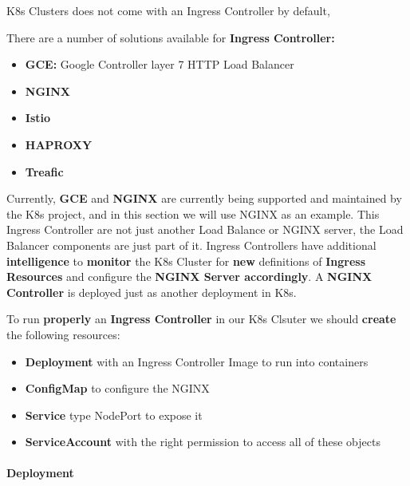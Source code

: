 \documentclass{article}
\begin{document}
K8s Clusters does not come with an Ingress Controller by default, 

There are a number of solutions available for \textbf{Ingress Controller:}
\begin{itemize}
    \item \textbf{GCE:} Google Controller layer 7 HTTP Load Balancer
    \item \textbf{NGINX}
    \item \textbf{Istio}
    \item \textbf{HAPROXY}
    \item \textbf{Treafic}
\end{itemize}

Currently, \textbf{GCE} and \textbf{NGINX} are currently being supported and maintained by the K8s project, and in this section we will use NGINX as an example. This Ingress Controller are not just another Load Balance or NGINX server, the Load Balancer components are just part of it. Ingress Controllers have additional \textbf{intelligence} to \textbf{monitor} the K8s Cluster for \textbf{new} definitions of \textbf{Ingress Resources} and configure the \textbf{NGINX Server accordingly}. A \textbf{NGINX Controller} is deployed just as another deployment in K8s.

To run \textbf{properly} an \textbf{Ingress Controller} in our K8s Clsuter we should \textbf{create} the following resources:

\begin{itemize}
    \item \textbf{Deployment} with an Ingress Controller Image to run into containers
    \item \textbf{ConfigMap} to configure the NGINX
    \item \textbf{Service} type NodePort to expose it
    \item \textbf{ServiceAccount} with the right permission to access all of these objects
\end{itemize}

\paragraph{Deployment}
\end{document}

